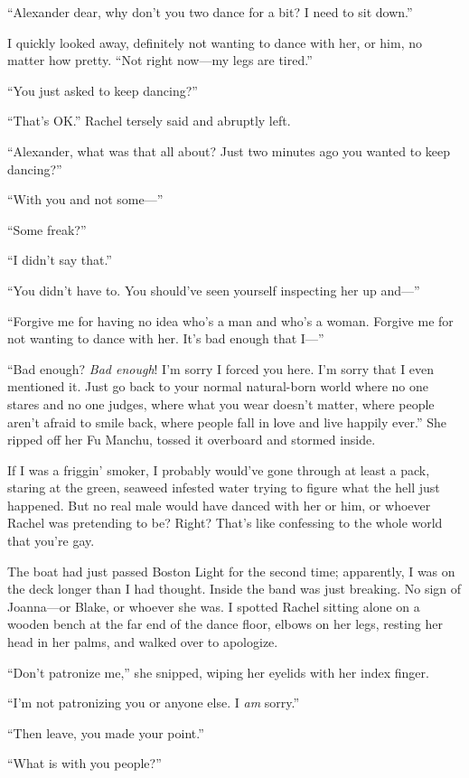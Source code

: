 ``Alexander dear, why don't you two dance for a bit? I need to sit
down.''

I quickly looked away, definitely not wanting to dance with her, or him,
no matter how pretty. ``Not right now---my legs are tired.''

``You just asked to keep dancing?''

``That's OK.'' Rachel tersely said and abruptly left.

``Alexander, what was that all about? Just two minutes ago you wanted to
keep dancing?''

``With you and not some---''

``Some freak?''

``I didn't say that.''

``You didn't have to. You should've seen yourself inspecting her up
and---''

``Forgive me for having no idea who's a man and who's a woman. Forgive
me for not wanting to dance with her. It's bad enough that I---''

``Bad enough? \emph{Bad enough}! I'm sorry I forced you here. I'm sorry
that I even mentioned it. Just go back to your normal natural-born world
where no one stares and no one judges, where what you wear doesn't
matter, where people aren't afraid to smile back, where people fall in
love and live happily ever.'' She ripped off her Fu Manchu, tossed it
overboard and stormed inside.

If I was a friggin' smoker, I probably would've gone through at least a
pack, staring at the green, seaweed infested water trying to figure what
the hell just happened. But no real male would have danced with her or
him, or whoever Rachel was pretending to be? Right? That's like
confessing to the whole world that you're gay.

The boat had just passed Boston Light for the second time; apparently, I
was on the deck longer than I had thought. Inside the band was just
breaking. No sign of Joanna---or Blake, or whoever she was. I spotted
Rachel sitting alone on a wooden bench at the far end of the dance
floor, elbows on her legs, resting her head in her palms, and walked
over to apologize.

``Don't patronize me,'' she snipped, wiping her eyelids with her index
finger.

``I'm not patronizing you or anyone else. I \emph{am} sorry.''

``Then leave, you made your point.''

``What is with you people?''

